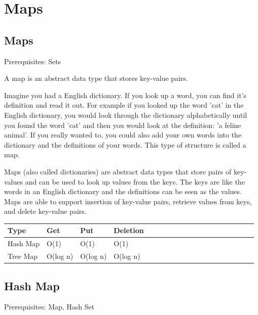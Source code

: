 \documentclass[11pt,oneside]{book}
\begin{document}
    \chapter{ Maps }
        \section{ Maps }
        

Prerequisites: Sets

A map is an abstract data type that stores key-value pairs.

Imagine you had a English dictionary. If you look up a word, you can find it's definition and read it out. For example if you looked up the word 'cat' in the English dictionary, you would look through the dictionary alphabetically until you found the word 'cat' and then you would look at the definition: 'a feline animal'. If you really wanted to, you could also add your own words into the dictionary and the definitions of your words. This type of structure is called a map.

Maps (also called dictionaries) are abstract data types that store pairs of key-values and can be used to look up values from the keys. The keys are like the words in an English dictionary and the definitions can be seen as the values. Maps are able to support insertion of key-value pairs, retrieve values from keys, and delete key-value pairs.


        

\begin{center}\begin{tabulary}{0.4\linewidth}{|l|l|l|l|l|l|l|l|l|l|l|l|l|l|l|l|l|l|l}\hline


  Type &
  Get &
  Put &
  Deletion\\
\hline


  Hash Map &
  O(1) &
  O(1) &
  O(1)\\

  Tree Map &
  O(log n) &
  O(log n) &
  O(log n)\\

\hline\end{tabulary}\end{center}


        \section{ Hash Map }
        

Prerequisites: Map, Hash Set
\end{document}
